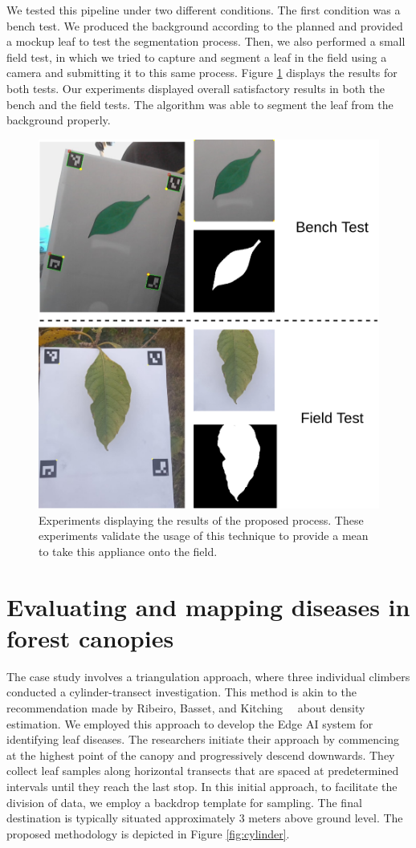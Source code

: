 We tested this pipeline under two different conditions. The first condition was a bench test. We produced the background according to the planned and provided a mockup leaf to test the segmentation process. Then, we also performed a small field test, in which we tried to capture and segment a leaf in the field using a camera and submitting it to this same process. Figure \ref{fig:experiments-final} displays the results for both tests. Our experiments displayed overall satisfactory results in both the bench and the field tests. The algorithm was able to segment the leaf from the background properly.

\begin{figure}[h!]
    \centering
    \includegraphics[width = .6\linewidth]{Figures/experiments.png}
    \caption{Experiments displaying the results of the proposed process. These experiments validate the usage of this technique to provide a mean to take this appliance onto the field.}
    \label{fig:experiments-final}
\end{figure}


\section{Evaluating and mapping diseases in forest canopies}

The case study involves a triangulation approach, where three individual climbers conducted a cylinder-transect investigation. This method is akin to the recommendation made by Ribeiro, Basset, and Kitching  \cite{ribeiro2014density} about density estimation. We employed this approach to develop the Edge AI system for identifying leaf diseases. The researchers initiate their approach by commencing at the highest point of the canopy and progressively descend downwards. They collect leaf samples along horizontal transects that are spaced at predetermined intervals until they reach the last stop. In this initial approach, to facilitate the division of data, we employ a backdrop template for sampling. The final destination is typically situated approximately 3 meters above ground level. The proposed methodology is depicted in Figure \ref{fig:cylinder}.

